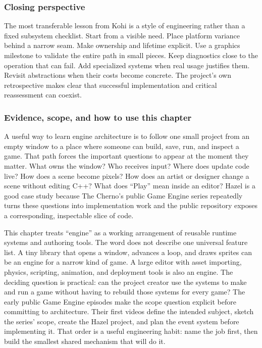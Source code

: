 \subsubsection{Closing perspective}\label{closing-perspective}

The most transferable lesson from Kohi is a style of engineering rather than a fixed subsystem checklist. Start from a visible need. Place platform variance behind a narrow seam. Make ownership and lifetime explicit. Use a graphics milestone to validate the entire path in small pieces. Keep diagnostics close to the operation that can fail. Add specialized systems when real usage justifies them. Revisit abstractions when their costs become concrete. The project's own retrospective makes clear that successful implementation and critical reassessment can coexist.

\subsubsection{Evidence, scope, and how to use this chapter}\label{evidence-scope-and-how-to-use-this-chapter}

A useful way to learn engine architecture is to follow one small project from an empty window to a place where someone can build, save, run, and inspect a game. That path forces the important questions to appear at the moment they matter. What owns the window? Who receives input? Where does update code live? How does a scene become pixels? How does an artist or designer change a scene without editing C++? What does ``Play'' mean inside an editor? Hazel is a good case study because The Cherno's public Game Engine series repeatedly turns these questions into implementation work and the public repository exposes a corresponding, inspectable slice of code.

This chapter treats ``engine'' as a working arrangement of reusable runtime systems and authoring tools. The word does not describe one universal feature list. A tiny library that opens a window, advances a loop, and draws sprites can be an engine for a narrow kind of game. A large editor with asset importing, physics, scripting, animation, and deployment tools is also an engine. The deciding question is practical: can the project creator use the systems to make and run a game without having to rebuild those systems for every game? The early public Game Engine episodes make the scope question explicit before committing to architecture. Their first videos define the intended subject, sketch the series' scope, create the Hazel project, and plan the event system before implementing it. That order is a useful engineering habit: name the job first, then build the smallest shared mechanism that will do it.

